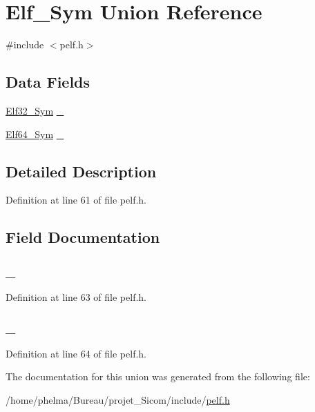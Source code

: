 \hypertarget{union_elf___sym}{\section{Elf\-\_\-\-Sym Union Reference}
\label{union_elf___sym}
}


{\ttfamily \#include $<$pelf.\-h$>$}

\subsection*{Data Fields}
\begin{DoxyCompactItemize}
\item 
\hyperlink{struct_elf32___sym}{Elf32\-\_\-\-Sym} \hyperlink{union_elf___sym_a3937312c57c72dd52964a22941af92ca}{\-\_}
\item 
\hyperlink{struct_elf64___sym}{Elf64\-\_\-\-Sym} \hyperlink{union_elf___sym_af414171e29f4290e322bdc5167ce9f02}{\-\_}
\end{DoxyCompactItemize}


\subsection{Detailed Description}


Definition at line 61 of file pelf.\-h.



\subsection{Field Documentation}
\hypertarget{union_elf___sym_a3937312c57c72dd52964a22941af92ca}{
\subsubsection[{\-\_\-32}]{ \-\_}}\label{union_elf___sym_a3937312c57c72dd52964a22941af92ca}


Definition at line 63 of file pelf.\-h.

\hypertarget{union_elf___sym_af414171e29f4290e322bdc5167ce9f02}{
\subsubsection[{\-\_\-64}]{ \-\_}}\label{union_elf___sym_af414171e29f4290e322bdc5167ce9f02}


Definition at line 64 of file pelf.\-h.



The documentation for this union was generated from the following file\-:\begin{DoxyCompactItemize}
\item 
/home/phelma/\-Bureau/projet\-\_\-\-Sicom/include/\hyperlink{pelf_8h}{pelf.\-h}\end{DoxyCompactItemize}
